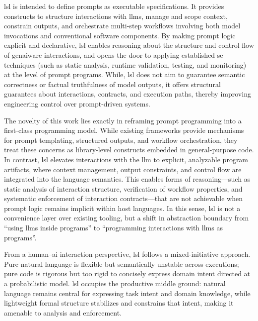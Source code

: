 \documentclass[manuscript,screen]{acmart}
\begin{document}
\ac{lsl} is intended to define prompts as executable specifications.
It provides constructs to structure interactions with \acp{llm}, manage and scope context, constrain outputs, and orchestrate multi-step workflows involving both model invocations and conventional software components.
By making prompt logic explicit and declarative, \ac{lsl} enables reasoning about the structure and control flow of \ac{genai}ware interactions, and opens the door to applying established \ac{se} techniques (such as static analysis, runtime validation, testing, and monitoring) at the level of prompt programs.
While, \ac{lsl} does not aim to guarantee semantic correctness or factual truthfulness of model outputs, it offers structural guarantees about interactions, contracts, and execution paths, thereby improving engineering control over prompt-driven systems.

The novelty of this work lies exactly in reframing prompt programming into a first-class programming model. 
While existing frameworks provide mechanisms for prompt templating, structured outputs, and workflow orchestration, they treat these concerns as library-level constructs embedded in general-purpose code. 
In contrast, \ac{lsl} elevates interactions with the \ac{llm} to explicit, analyzable program artifacts, where context management, output constraints, and control flow are integrated into the language semantics. 
This enables forms of reasoning—such as static analysis of interaction structure, verification of workflow properties, and systematic enforcement of interaction contracts—that are not achievable when prompt logic remains implicit within host languages.
In this sense, \ac{lsl} is not a convenience layer over existing tooling, but a shift in abstraction boundary from ``using \acp{llm} inside programs'' to ``programming interactions with \acp{llm} as programs''.

From a human–\ac{ai} interaction perspective, \ac{lsl} follows a mixed-initiative approach.
Pure natural language is flexible but semantically unstable across executions; pure code is rigorous but too rigid to concisely express domain intent directed at a probabilistic model.
\ac{lsl} occupies the productive middle ground: natural language remains central for expressing task intent and domain knowledge, while lightweight formal structure stabilizes and constrains that intent, making it amenable to analysis and enforcement.
\end{document}
